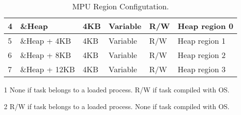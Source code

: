 \begin{table}[H]
\begin{minipage}{10cm}
\begin{threeparttable}[t]
\begin{tabular}{|l|l|l|l|l|l|}
    4                 & \&Heap                                              & 4KB                                                 & Variable\tnote{2}                          & R/W                                      & Heap region 0                                                                                                  \\ \hline
    5                 & \&Heap + 4KB                                        & 4KB                                                 & Variable\tnote{2}                          & R/W                                      & Heap region 1                                                                                                  \\ \hline
    6                 & \&Heap + 8KB                                        & 4KB                                                 & Variable\tnote{2}                          & R/W                                      & Heap region 2                                                                                                  \\ \hline
    7                 & \&Heap + 12KB                                       & 4KB                                                 & Variable\tnote{2}                          & R/W                                      & Heap region 3                                                                                                  \\ \hline
    \end{tabular}
    \begin{tablenotes}
        \item[1] None if task belongs to a loaded process. R/W if task compiled with OS.
        \item[2] R/W if task belongs to a loaded process. None if task compiled with OS.
   \end{tablenotes}
\end{threeparttable}
\end{minipage}
    \caption{MPU Region Configutation.}
    \label{table:mpu_cfg}
\end{table}

